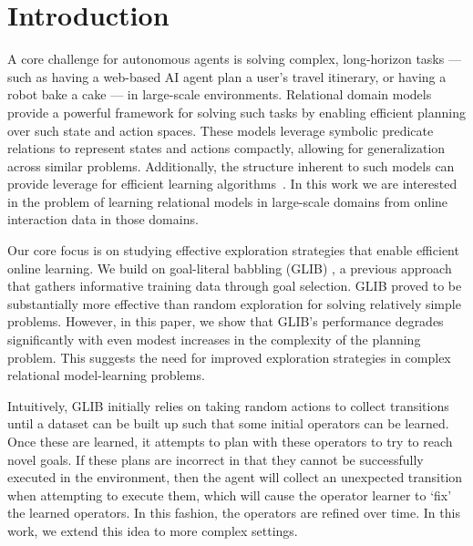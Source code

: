 \section{Introduction}
\label{sec:intro}
A core challenge for autonomous agents is solving complex, long-horizon tasks --- such as having a web-based AI agent plan a user's travel itinerary, or having a robot bake a cake --- in large-scale environments.
Relational domain models provide a powerful framework for solving such tasks by enabling efficient planning over such state and action spaces. 
These models leverage symbolic predicate relations \cite{Fox2003} to represent states and actions compactly, allowing for generalization across similar problems. 
Additionally, the structure inherent to such models can provide leverage for efficient learning algorithms~\cite{zpk}.
In this work we are interested in the problem of learning relational models in large-scale domains from online interaction data in those domains.

Our core focus is on studying effective exploration strategies that enable efficient online learning.
We build on goal-literal babbling (GLIB) \cite{glib}, a previous approach that gathers informative training data through goal selection. GLIB proved to be substantially more effective than random exploration for solving relatively simple problems. However, in this paper, we show that GLIB's performance degrades significantly with even modest increases in the complexity of the planning problem. This suggests the need for improved exploration strategies in complex relational model-learning problems.

Intuitively, GLIB initially relies on taking random actions to collect transitions until a dataset can be built up such that some initial operators can be learned.
Once these are learned, it attempts to plan with these operators to try to reach novel goals.
If these plans are incorrect in that they cannot be successfully executed in the environment, then the agent will collect an unexpected transition when attempting to execute them, which will cause the operator learner to `fix' the learned operators.
In this fashion, the operators are refined over time. In this work, we extend this idea to more complex settings.


